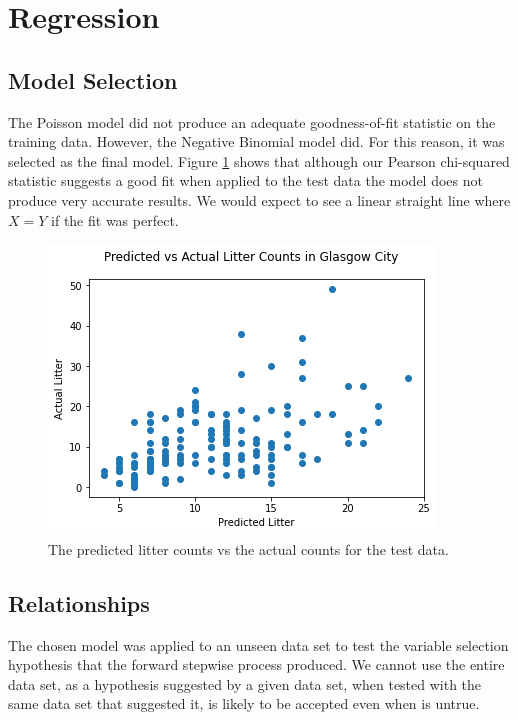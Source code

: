 \documentclass{thesis}
\begin{document}
\newpage
\section{Regression}

\subsection{Model Selection}

The Poisson model did not produce an adequate goodness-of-fit statistic on the training data. However, the Negative Binomial model did. For this reason, it was selected as the final model. Figure \ref{fig:predicted-vs-actual-test} shows that although our Pearson chi-squared statistic suggests a good fit when applied to the test data the model does not produce very accurate results. We would expect to see a linear straight line where $X = Y$ if the fit was perfect.

\begin{figure}[h!]
    \centering
    \includegraphics[scale=0.6]{images/predicted-vs-actual-test.png}
    \caption{The predicted litter counts vs the actual counts for the test data.}
    \label{fig:predicted-vs-actual-test}
\end{figure}

\subsection{Relationships}

The chosen model was applied to an unseen data set to test the variable selection hypothesis that the forward stepwise process produced. We cannot use the entire data set, as a hypothesis suggested by a given data set, when tested with the same data set that suggested it, is likely to be accepted even when is untrue\cite{testing-hyp-wikipedia}.
\end{document}
